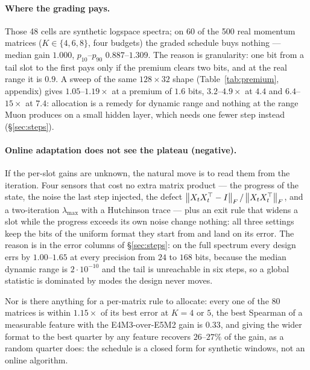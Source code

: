 \paragraph{Where the grading pays.}
\label{sec:premium}
Those 48 cells are synthetic logspace spectra; on 60 of the 500 real momentum matrices
($K\in\{4,6,8\}$, four budgets) the graded schedule buys nothing --- median gain $1.000$,
$p_{10}$--$p_{90}$ $0.887$--$1.309$.  The reason is granularity: one bit from a tail slot to the first pays only if the premium
clears two bits, and at the real range it is $0.9$.  A sweep of the same $128\times32$ shape (Table~\ref{tab:premium}, appendix)
gives $1.05$--$1.19\times$ at a premium of $1.6$ bits, $3.2$--$4.9\times$ at $4.4$ and
$6.4$--$15\times$ at $7.4$: allocation is a remedy for dynamic range and nothing at the
range Muon produces on a small hidden layer, which needs one fewer step instead
(\S\ref{sec:steps}).

\paragraph{Online adaptation does not see the plateau (negative).}
\label{sec:online}
If the per-slot gains are unknown, the natural move is to read them from the iteration.
Four sensors that cost no extra matrix product --- the progress of the state, the noise the
last step injected, the defect
$\left\lVert X_tX_t^\top-I \right\rVert_F/\left\lVert X_tX_t^\top \right\rVert_F$, and a two-iteration $\lambda_{\max}$ with a
Hutchinson trace --- plus an exit rule that widens a slot while the progress exceeds its own
noise change nothing: all three settings keep the bits of the uniform format they start
from and land on its error.  The reason is in the error columns of
\S\ref{sec:steps}: on the full spectrum every design errs by $1.00$--$1.65$
at every precision from $24$ to $168$ bits, because the median dynamic range is
$2\cdot10^{-10}$ and the tail is unreachable in six steps, so a global statistic is
dominated by modes the design never moves.

Nor is there anything for a per-matrix rule to allocate: every one of the 80 matrices is
within $1.15\times$ of its best error at $K=4$ or $5$, the best Spearman of a measurable
feature with the E4M3-over-E5M2 gain is $0.33$, and giving the wider format to the best
quarter by any feature recovers $26$--$27\%$ of the gain, as a random quarter does: the
schedule is a closed form for synthetic windows, not an online algorithm.
